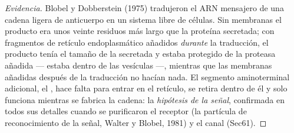 \begin{proof}[Evidencia]
Blobel y Dobberstein (1975) tradujeron el ARN mensajero de una cadena
ligera de anticuerpo en un sistema libre de células. Sin membranas el
producto era unos veinte residuos más largo que la proteína secretada;
con fragmentos de retículo endoplasmático añadidos \emph{durante} la
traducción, el producto tenía el tamaño de la secretada y estaba
protegido de la proteasa añadida --- estaba dentro de las vesículas ---,
mientras que las membranas añadidas después de la traducción no hacían
nada. El segmento aminoterminal adicional, el , hace falta
para entrar en el retículo, se retira dentro de él y solo funciona
mientras se fabrica la cadena: la \emph{hipótesis de la señal},
confirmada en todos sus detalles cuando se purificaron el receptor (la
partícula de reconocimiento de la señal, Walter y Blobel, 1981) y el
canal (Sec61).
\end{proof}

